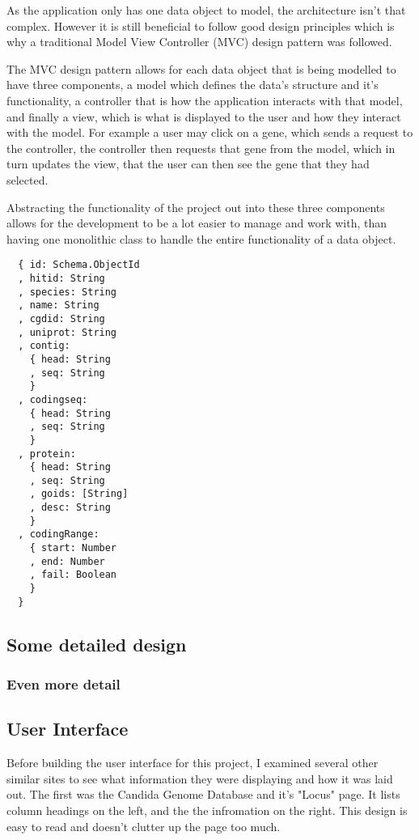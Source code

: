 As the application only has one data object to model, the architecture isn't that complex. However it is still beneficial to follow good design principles which is why a traditional Model View Controller (MVC) design pattern was followed. 

The MVC design pattern allows for each data object that is being modelled to have three components, a model which defines the data's structure and it's functionality, a controller that is how the application interacts with that model, and finally a view, which is what is displayed to the user and how they interact with the model. For example a user may click on a gene, which sends a request to the controller, the controller then requests that gene from the model, which in turn updates the view, that the user can then see the gene that they had selected. 

Abstracting the functionality of the project out into these three components allows for the development to be a lot easier to manage and work with, than having one monolithic class to handle the entire functionality of a data object. 

\begin{lstlisting}
  { id: Schema.ObjectId
  , hitid: String
  , species: String
  , name: String
  , cgdid: String
  , uniprot: String
  , contig: 
    { head: String
    , seq: String 
    }
  , codingseq: 
    { head: String
    , seq: String 
    }
  , protein: 
    { head: String
    , seq: String
    , goids: [String]
    , desc: String 
    }
  , codingRange: 
    { start: Number
    , end: Number
    , fail: Boolean 
    }
  }
\end{lstlisting}

\subsection{Some detailed design}

\subsubsection{Even more detail}

\subsection{User Interface}
Before building the user interface for this project, I examined several other similar sites to see what information they were displaying and how it was laid out. The first was the Candida Genome Database\cite{cgd} and it's "Locus" page. It lists column headings on the left, and the the infromation on the right. This design is easy to read and doesn't clutter up the page too much.

